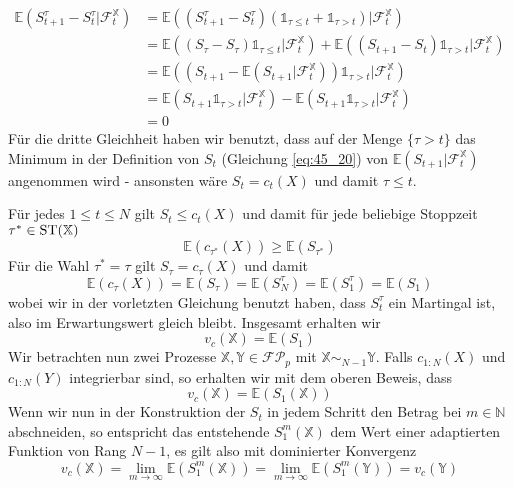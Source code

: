 \begin{example}
\begin{enumerate}
         \begin{align*}
            \mathbb{E}(S^\tau_{t+1}-S^\tau_t \vert \mathcal{F}^\mathbb{X}_t) &= \mathbb{E}((S^\tau_{t+1} - S^\tau_t)(\mathds{1}_{\tau \leq t} + \mathds{1}_{\tau > t})\vert \mathcal{F}^\mathbb{X}_t) \\
            &= \mathbb{E}((S_\tau-S_\tau)\mathds{1}_{\tau\leq t} \vert \mathcal{F}^\mathbb{X}_t) + \mathbb{E}((S_{t+1} - S_t ) \mathds{1}_{\tau > t} \vert \mathcal{F}^\mathbb{X}_t) \\
            &= \mathbb{E}\left((S_{t+1} - \mathbb{E}(S_{t+1} \vert \mathcal{F}^\mathbb{X}_t))\mathds{1}_{\tau>t} \vert \mathcal{F}^\mathbb{X}_t\right) \\
            &= \mathbb{E}(S_{t+1}\mathds{1}_{\tau>t} \vert \mathcal{F}^\mathbb{X}_t) - \mathbb{E}(S_{t+1} \mathds{1}_{\tau>t} \vert \mathcal{F}^\mathbb{X}_t) \\
            &= 0
         \end{align*}
         Für die dritte Gleichheit haben wir benutzt, dass auf der Menge $\{\tau > t\}$ das Minimum in der Definition von $S_t$ (Gleichung \ref{eq:45_20}) von $\mathbb{E}(S_{t+1} \vert \mathcal{F}_t^\mathbb{X})$ angenommen wird - ansonsten wäre $S_t=c_t(X)$ und damit $\tau \leq t$.

        Für jedes $1 \leq t \leq N$ gilt $S_t \leq c_t(X)$ und damit für jede beliebige Stoppzeit $\tau^* \in \operatorname{ST}(\mathbb{X})$
        $$\mathbb{E}(c_{\tau^*}(X)) \geq \mathbb{E}(S_{\tau^*})$$
        Für die Wahl $\tau^*=\tau$ gilt $S_\tau = c_\tau(X)$ und damit
        $$\mathbb{E}(c_\tau(X)) = \mathbb{E}(S_\tau) = \mathbb{E}(S_N^\tau) = \mathbb{E}(S_1^\tau) = \mathbb{E}(S_1)$$
        wobei wir in der vorletzten Gleichung benutzt haben, dass $S_t^\tau$ ein Martingal ist, also im Erwartungswert gleich bleibt. Insgesamt erhalten wir 
        $$v_c(\mathbb{X}) = \mathbb{E}(S_1)$$
        Wir betrachten nun zwei Prozesse $\mathbb{X,Y} \in \mathcal{FP}_p$ mit $\mathbb{X} \sim_{N-1} \mathbb{Y}$. Falls $c_{1:N}(X)$ und $c_{1:N}(Y)$ integrierbar sind, so erhalten wir mit dem oberen Beweis, dass 
        $$v_c(\mathbb{X}) = \mathbb{E}(S_1(\mathbb{X}))$$
        Wenn wir nun in der Konstruktion der $S_t$ in jedem Schritt den Betrag bei $m \in \mathbb{N}$ abschneiden, so entspricht das entstehende $S_1^m(\mathbb{X})$ dem Wert einer adaptierten Funktion von Rang $N-1$, es gilt also mit dominierter Konvergenz
        $$v_c(\mathbb{X}) = \lim_{m\rightarrow \infty} \mathbb{E}(S_1^m(\mathbb{X})) = \lim_{m\rightarrow \infty} \mathbb{E}(S_1^m(\mathbb{Y})) = v_c(\mathbb{Y})$$

    \end{enumerate}

\end{example}
